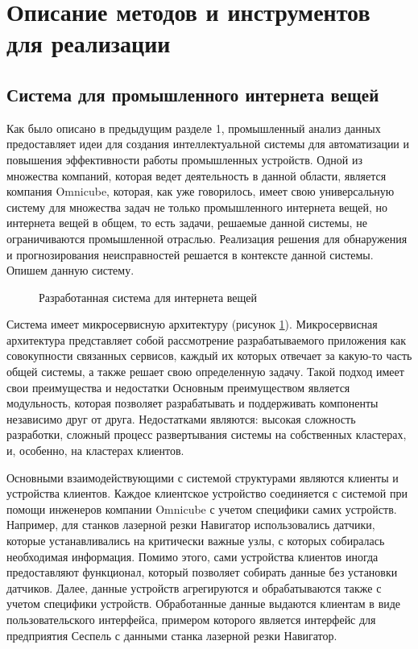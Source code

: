 \section{Описание методов и инструментов для реализации}

\subsection{Система для промышленного интернета вещей}

Как было описано в предыдущим разделе 1,
промышленный анализ данных предоставляет идеи для создания
интеллектуальной системы для автоматизации и повышения
эффективности работы промышленных устройств.
Одной из множества компаний, которая ведет деятельность в данной области,
является компания Omnicube, которая, как уже говорилось,
имеет свою универсальную систему для множества
задач не только промышленного интернета вещей,
но интернета вещей в общем, то есть задачи,
решаемые данной системы, не ограничиваются промышленной отраслью.
Реализация решения для обнаружения и прогнозирования
неисправностей решается в контексте данной системы.
Опишем данную систему.

\begin{figure}[h]
    \caption{Разработанная система для интернета вещей}
    \label{sys2}
\end{figure}

Система имеет микросервисную архитектуру (рисунок \ref{sys2}).
Микросервисная архитектура представляет собой рассмотрение
разрабатываемого приложения как совокупности связанных сервисов,
каждый их которых отвечает за какую-то часть общей системы,
а также решает свою определенную задачу.
Такой подход имеет свои преимущества и недостатки
Основным преимуществом является модульность,
которая позволяет разрабатывать и поддерживать
компоненты независимо друг от друга.
Недостатками являются:
высокая сложность разработки,
сложный процесс развертывания системы
на собственных кластерах,
и, особенно, на кластерах клиентов.

Основными взаимодействующими с системой структурами являются клиенты и устройства клиентов.
Каждое клиентское устройство соединяется с системой при помощи инженеров компании Omnicube
с учетом специфики самих устройств. Например, для станков лазерной резки Навигатор
использовались датчики, которые устанавливались на критически важные узлы, с которых собиралась необходимая информация.
Помимо этого, сами устройства клиентов иногда предоставляют функционал, который позволяет собирать данные без установки датчиков.
Далее, данные устройств агрегируются и обрабатываются также с учетом специфики устройств.
Обработанные данные выдаются клиентам в виде пользовательского интерфейса, примером которого является
интерфейс для предприятия Сеспель с данными станка лазерной резки Навигатор.


